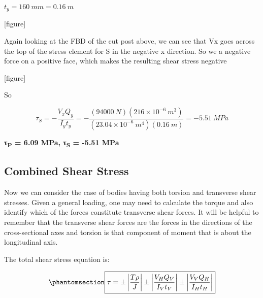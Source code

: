 \documentclass[
  letterpaper,
  DIV=11,
  numbers=noendperiod]{scrreprt}
\theoremstyle{definition}
\theoremstyle{remark}
\begin{document}
\begin{tcolorbox}
\begin{tcolorbox}
\(t_y = 160{~mm} = 0.16{~m}\)

{[}figure{]}

Again looking at the FBD of the cut post above, we can see that Vx goes
across the top of the stress element for S in the negative x direction.
So we a negative force on a positive face, which makes the resulting
shear stress negative

{[}figure{]}

So

\[
\tau_S=-\frac{V_x Q_y}{I_y t_y}=-\frac{(94000{~N})(216 \times 10^{-6}{~m}^3)}{(23.04 \times 10^{-6}{~m}^4)(0.16{~m})}=-5.51{~MPa}
\]

\textbf{τ\textsubscript{P} = 6.09 MPa, τ\textsubscript{S} = -5.51 MPa}

\end{tcolorbox}

\end{tcolorbox}

\subsection{Combined Shear Stress}\label{combined-shear-stress}

Now we can consider the case of bodies having both torsion and
transverse shear stresses. Given a general loading, one may need to
calculate the torque and also identify which of the forces constitute
transverse shear forces. It will be helpful to remember that the
transverse shear forces are the forces in the directions of the
cross-sectional axes and torsion is that component of moment that is
about the longitudinal axis.

The total shear stress equation is:

\begin{equation}\phantomsection\label{eq-14.4}{
\boxed{\tau= \pm\left|\frac{T \rho}{J}\right| \pm\left|\frac{V_H Q_V}{I_V t_V}\right| \pm\left|\frac{V_V Q_H}{I_H t_H}\right|}
}\end{equation}
\end{document}
